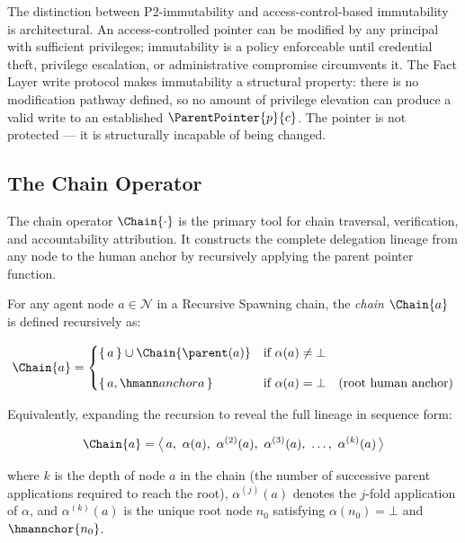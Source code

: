 The distinction between P2-immutability and access-control-based immutability is architectural. An access-controlled pointer can be modified by any principal with sufficient privileges; immutability is a policy enforceable until credential theft, privilege escalation, or administrative compromise circumvents it. The Fact Layer write protocol makes immutability a structural property: there is no modification pathway defined, so no amount of privilege elevation can produce a valid write to an established $\ParentPointer{p}{c}$. The pointer is not protected --- it is structurally incapable of being changed.

\subsection{The Chain Operator}
\label{sec:chain-operator}

The chain operator $\Chain{\cdot}$ is the primary tool for chain traversal, verification, and accountability attribution. It constructs the complete delegation lineage from any node to the human anchor by recursively applying the parent pointer function.

\begin{dfn}
\label{def:chain-operator}
For any agent node $a \in \mathcal{N}$ in a Recursive Spawning chain, the \emph{chain} $\Chain{a}$ is defined recursively as:

\begin{equation}
\Chain{a} =
\begin{cases}
\{\,a\,\} \cup \Chain{\parent(a)} & \text{if } \alpha(a) \neq \bot \\[10pt]
\{\,a,\hmann anchor{a}\,\} & \text{if } \alpha(a) = \bot \quad \text{(root human anchor)}
\end{cases}
\label{eq:chain-recursive}
\end{equation}

Equivalently, expanding the recursion to reveal the full lineage in sequence form:

\begin{equation}
\Chain{a} = \bigl\langle\, a,\ \alpha(a),\ \alpha^{(2)}(a),\ \alpha^{(3)}(a),\ \ldots,\ \alpha^{(k)}(a)\,\bigr\rangle
\label{eq:chain-expanded}
\end{equation}

where $k$ is the depth of node $a$ in the chain (the number of successive parent applications required to reach the root), $\alpha^{(j)}(a)$ denotes the $j$-fold application of $\alpha$, and $\alpha^{(k)}(a)$ is the unique root node $n_0$ satisfying $\alpha(n_0) = \bot$ and $\hmannchor{n_0}$.
\end{dfn}

